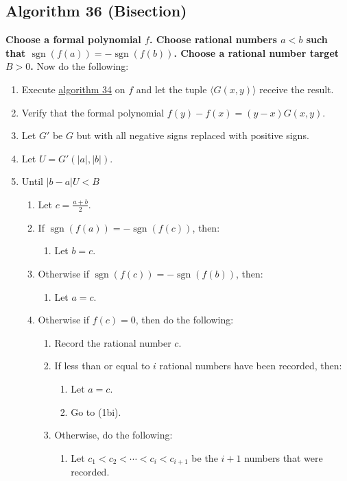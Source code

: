 \documentclass[twocolumn]{article}
\DeclareMathOperator{\sgn}{sgn}
\begin{document}
		\subsection{Algorithm 36 (Bisection)}\label{sec:algorithm 36}
			\textbf{Choose a formal polynomial $f$. Choose rational numbers $a<b$ such that $\sgn(f(a))=-\sgn(f(b))$. Choose a rational number target $B>0$.} Now do the following:
			\begin{enumerate}
				\item Execute \hyperref[sec:algorithm 34]{algorithm 34} on $f$ and let the tuple $\langle G(x,y)\rangle$ receive the result.
				\item Verify that the formal polynomial $f(y)-f(x)=(y-x)G(x,y)$.
				\item Let $G'$ be $G$ but with all negative signs replaced with positive signs.
				\item Let $U=G'(\lvert a\rvert,\lvert b\rvert)$.
				\item Until $\lvert b-a\rvert U<B$
				\begin{enumerate}
					\item Let $c=\frac{a+b}{2}$.
					\item If $\sgn(f(a))=-\sgn(f(c))$, then:
					\begin{enumerate}
						\item Let $b=c$.
					\end{enumerate}
					\item Otherwise if $\sgn(f(c))=-\sgn(f(b))$, then:
					\begin{enumerate}
						\item Let $a=c$.
					\end{enumerate}
					\item Otherwise if $f(c)=0$, then do the following:
					\begin{enumerate}
						\item Record the rational number $c$.
						\item If less than or equal to $i$ rational numbers have been recorded, then:
						\begin{enumerate}
							\item Let $a=c$.
							\item Go to (1bi).
						\end{enumerate}
						\item Otherwise, do the following:
						\begin{enumerate}
							\item Let $c_1<c_2<\cdots<c_i<c_{i+1}$ be the $i+1$ numbers that were recorded.

\end{enumerate}
\end{enumerate}
\end{enumerate}
\end{enumerate}
\end{document}
